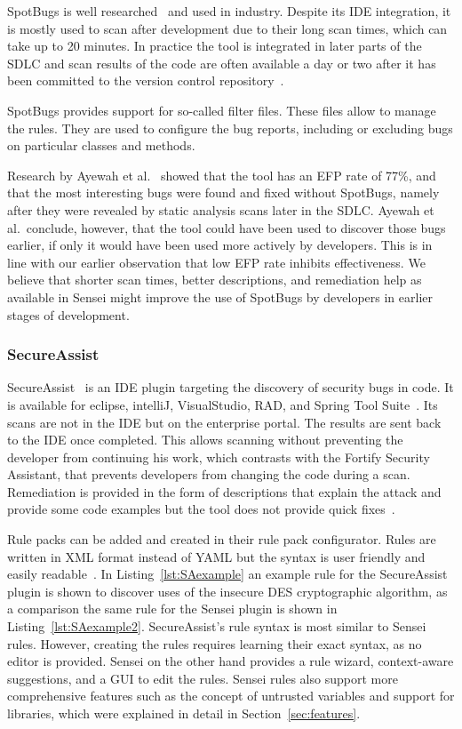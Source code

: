 SpotBugs is well researched~\cite{ayewah2007using,ayewah2010google,findbugs2008} and used in industry. Despite its IDE integration, it is mostly used to scan after development due to their long scan times, which can take up to 20 minutes. In practice the tool is integrated in later parts of the SDLC and scan results of the code are often available a day or two after it has been committed to the version control repository~\cite{ayewah2010google}. 

SpotBugs provides support for so-called filter files. These files allow to manage the rules. They are used to configure the bug reports, including or excluding bugs on particular classes and methods. 

Research by Ayewah et al.~\cite{ayewah2007using} showed that the tool has an EFP rate of 77\%, and that the most interesting bugs were found and fixed without SpotBugs, namely after they were revealed by static analysis scans later in the SDLC. Ayewah et al.\ conclude, however, that the tool could have been used to discover those bugs earlier, if only it would have been used more actively by developers.  This is in line with our earlier observation that low EFP rate inhibits effectiveness. We believe that shorter scan times, better descriptions, and remediation help as available in Sensei might improve the use of SpotBugs by developers in earlier stages of development.

\subsubsection{SecureAssist}
SecureAssist~\cite{secureassist} is an IDE plugin targeting the discovery of security bugs in code. It is available for eclipse, intelliJ, VisualStudio, RAD, and Spring Tool Suite~\cite{sastinide}. Its scans are not in the IDE but on the enterprise portal. The results are sent back to the IDE once completed. This allows scanning without preventing the developer from continuing his work, which contrasts with the Fortify Security Assistant, that prevents developers from changing the code during a scan. Remediation is provided in the form of descriptions that explain the attack and provide some code examples but the tool does not provide quick fixes~\cite{secureassistide}. 

Rule packs can be added and created in their rule pack configurator. Rules are written in XML format instead of YAML but the syntax is user friendly and easily readable~\cite{secureassistruletutorial}. In Listing~\ref{lst:SAexample} an example rule for the SecureAssist plugin is shown to discover uses of the insecure DES cryptographic algorithm, as a comparison the same rule for the Sensei plugin is shown in Listing~\ref{lst:SAexample2}. SecureAssist's rule syntax is most similar to Sensei rules. However, creating the rules requires learning their exact syntax, as no editor is provided. Sensei on the other hand provides a rule wizard, context-aware suggestions, and a GUI to edit the rules. Sensei rules also support more comprehensive features such as the concept of untrusted variables and support for libraries, which were explained in detail in Section~\ref{sec:features}.

